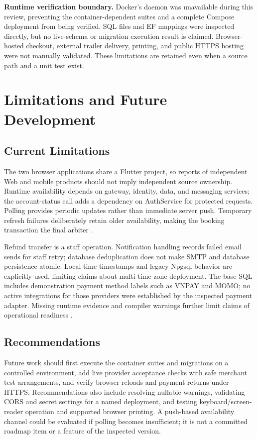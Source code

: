 \documentclass[conference]{IEEEtran}
\begin{document}
\textbf{Runtime verification boundary.} Docker's daemon was unavailable during this review, preventing the
container-dependent suites and a complete Compose deployment from being
verified. SQL files and EF mappings were inspected directly, but no live-schema
or migration execution result is claimed. Browser-hosted checkout, external
trailer delivery, printing, and public HTTPS hosting were not manually
validated. These limitations are retained even when a source path and a unit
test exist.

\section{Limitations and Future Development}
\subsection{Current Limitations}
The two browser applications share a Flutter project, so reports of independent
Web and mobile products should not imply independent source ownership. Runtime
availability depends on gateway, identity, data, and messaging services; the
account-status call adds a dependency on AuthService for protected requests.
Polling provides periodic updates rather than immediate server push. Temporary
refresh failures deliberately retain older availability, making the booking
transaction the final arbiter \cite{client,gateway,booking}.

Refund transfer is a staff operation. Notification handling records failed
email sends for staff retry; database deduplication does not make SMTP and
database persistence atomic. Local-time timestamps and legacy Npgsql behavior
are explicitly used, limiting claims about multi-time-zone deployment. The
base SQL includes demonstration payment method labels such as VNPAY and MOMO;
no active integrations for those providers were established by the inspected
payment adapter. Missing runtime evidence and compiler warnings further limit
claims of operational readiness \cite{db,booking,deployment}.

\subsection{Recommendations}
Future work should first execute the container suites and migrations on a
controlled environment, add live provider acceptance checks with safe merchant
test arrangements, and verify browser reloads and payment returns under HTTPS.
Recommendations also include resolving nullable warnings, validating CORS and
secret settings for a named deployment, and testing keyboard/screen-reader
operation and supported browser printing. A push-based availability channel
could be evaluated if polling becomes insufficient; it is not a committed
roadmap item or a feature of the inspected version.
\end{document}

